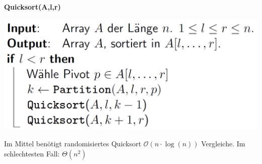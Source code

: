 \vspace{-4pt}
\begin{sectionbox}
\textbf{Quicksort(A,l,r)}\par
\includegraphics[width = 0.8\columnwidth]{../img/QuicksortCode.png}
\par\smallskip
\begin{greenbox}
Im Mittel benötigt randomisiertes Quicksort $\mathcal{O}(n \cdot \operatorname{log}(n))$ Vergleiche. Im schlechtesten Fall: $\Theta(n^2)$
\end{greenbox}
\end{sectionbox}

